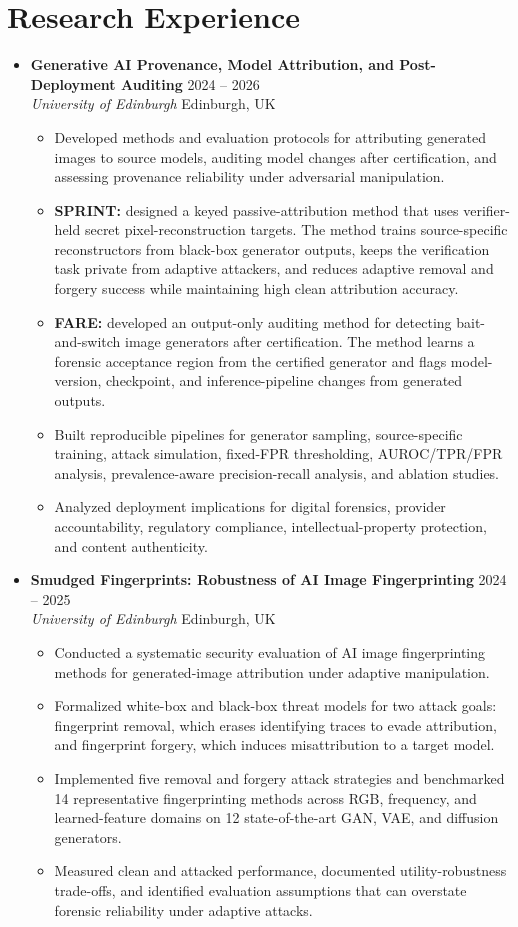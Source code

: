 \documentclass[10pt,a4paper]{article}
\newcommand{\projectentry}[4]{%
    \Needspace{4\baselineskip}%
    \item \textbf{#1} \hfill #4\\
    \textit{#2} \hfill #3
}
\begin{document}
\section*{Research Experience}
\begin{itemize}
\projectentry{Generative AI Provenance, Model Attribution, and Post-Deployment Auditing}{University of Edinburgh}{Edinburgh, UK}{2024 -- 2026}
    \begin{itemize}
        \item Developed methods and evaluation protocols for attributing generated images to source models, auditing model changes after certification, and assessing provenance reliability under adversarial manipulation.
        \item \textbf{SPRINT:} designed a keyed passive-attribution method that uses verifier-held secret pixel-reconstruction targets. The method trains source-specific reconstructors from black-box generator outputs, keeps the verification task private from adaptive attackers, and reduces adaptive removal and forgery success while maintaining high clean attribution accuracy.
        \item \textbf{FARE:} developed an output-only auditing method for detecting bait-and-switch image generators after certification. The method learns a forensic acceptance region from the certified generator and flags model-version, checkpoint, and inference-pipeline changes from generated outputs.
        \item Built reproducible pipelines for generator sampling, source-specific training, attack simulation, fixed-FPR thresholding, AUROC/TPR/FPR analysis, prevalence-aware precision-recall analysis, and ablation studies.
        \item Analyzed deployment implications for digital forensics, provider accountability, regulatory compliance, intellectual-property protection, and content authenticity.
    \end{itemize}

\projectentry{Smudged Fingerprints: Robustness of AI Image Fingerprinting}{University of Edinburgh}{Edinburgh, UK}{2024 -- 2025}
    \begin{itemize}
        \item Conducted a systematic security evaluation of AI image fingerprinting methods for generated-image attribution under adaptive manipulation.
        \item Formalized white-box and black-box threat models for two attack goals: fingerprint removal, which erases identifying traces to evade attribution, and fingerprint forgery, which induces misattribution to a target model.
        \item Implemented five removal and forgery attack strategies and benchmarked 14 representative fingerprinting methods across RGB, frequency, and learned-feature domains on 12 state-of-the-art GAN, VAE, and diffusion generators.
        \item Measured clean and attacked performance, documented utility-robustness trade-offs, and identified evaluation assumptions that can overstate forensic reliability under adaptive attacks.
    \end{itemize}


\end{itemize}
\end{document}
